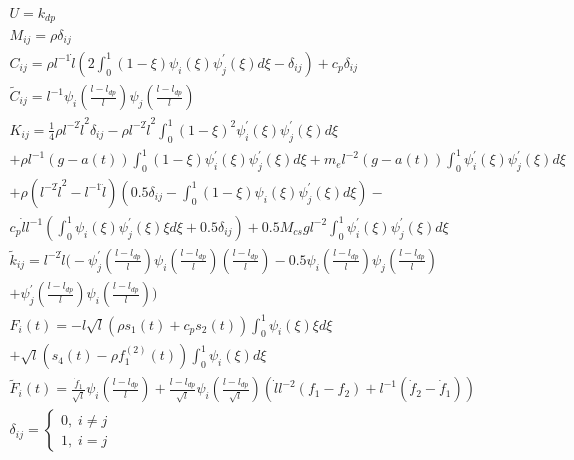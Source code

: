 \documentclass[letterpaper, 11 pt, conference]{ieeeconf}
\begin{document}
\begin{equation}\label{ODE_model_coefficients}
\begin{array}{l}
{\scriptstyle U=k_{dp}}\\
{\scriptstyle{M_{ij}=\rho\delta_{ij}}}\\
{\scriptstyle{C_{ij}=\rho l^{-1}\dot{l}\left(2\int_{0}^{1}(1-\xi)\psi_{i}(\xi)\psi^{'}_{j}(\xi)d\xi-\delta_{ij}\right)+c_{p}\delta_{ij}}}\\
{\scriptstyle \tilde{C}_{ij}=l^{-1}\psi_{i}(\frac{l-l_{dp}}{l}) \psi_{j}(\frac{l-l_{dp}}{l})}\\
{\scriptstyle{K_{ij}=\frac{1}{4}\rho
l^{-2}\dot{l}^{2}\delta_{ij}-\rho
l^{-2}\dot{l}^{2}\int_{0}^{1}(1-\xi)^{2}\psi^{'}_{i}(\xi)\psi^{'}_{j}(\xi)d\xi}}\\{\scriptstyle{+\rho
l^{-1}(g-a(t))\int_{0}^{1}(1-\xi)\psi^{'}_{i}(\xi)\psi^{'}_{j}(\xi)d\xi+}}
{\scriptstyle{m_{e}l^{-2}(g-a(t))\int_{0}^{1}\psi^{'}_{i}(\xi)\psi^{'}_{j}(\xi)d\xi}}\\{\scriptstyle{+\rho(l^{-2}\dot{l}^{2}-l^{-1}\ddot{l})\left(0.5\delta_{ij}
-\int_{0}^{1}(1-\xi)\psi_{i}(\xi)\psi^{'}_{j}(\xi)d\xi\right)-}}\\
{\scriptstyle{c_{p}\dot{l}l^{-1}(\int_{0}^{1}\psi_{i}(\xi)\psi^{'}_{j}(\xi)\xi
d\xi+0.5\delta_{ij})+0.5M_{cs}gl^{-2}\int_{0}^{1}\psi^{'}_{i}(\xi)\psi^{'}_{j}(\xi)d\xi}}\\
{\scriptstyle \tilde{k}_{ij}=l^{-2}\dot{l}\big(-\psi^{'}_{j}(\frac{l-l_{dp}}{l})\psi_{i}(\frac{l-l_{dp}}{l})(\frac{l-l_{dp}}{l})-0.5\psi_{i}(\frac{l-l_{dp}}{l})\psi_{j}(\frac{l-l_{dp}}{l})}\\
{\scriptstyle+\psi^{'}_{j}(\frac{l-l_{dp}}{l})\psi_{i}(\frac{l-l_{dp}}{l})\big)}\\
{\scriptstyle{ F_{i}(t)=-l\sqrt{l}\left(\rho
s_{1}(t)+c_{p}s_{2}(t)\right)\int_{0}^{1}\psi_{i}(\xi)\xi
d\xi}}\\{\scriptstyle{+\sqrt{l}\left(s_{4}(t)-\rho
f^{(2)}_{1}(t)\right)\int_{0}^{1}\psi_{i}(\xi)d\xi}}\\
{\scriptstyle
\tilde{F}_{i}(t)=\frac{\dot{f}_{1}}{\sqrt{l}}\psi_{i}(\frac{l-l_{dp}}{l})+\frac{l-l_{dp}}{\sqrt{l}}\psi_{i}(\frac{l-l_{dp}}{\sqrt{l}})(\dot{l}l^{-2}(f_{1}-f_{2})+l^{-1}(\dot{f}_{2}-\dot{f}_{1}))}
\\
\delta_{ij}=\left\{\begin{array}{l}0,\;i\neq
j\\1,\;i=j\end{array}\right.
\end{array}
\end{equation}
\end{document}
